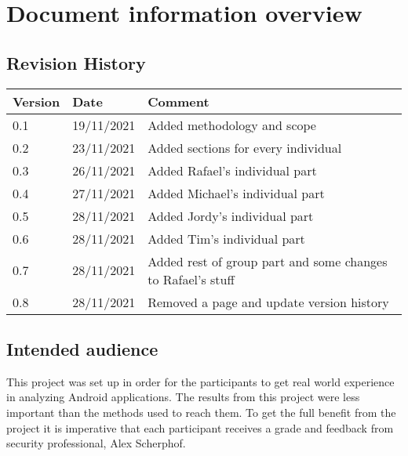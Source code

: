 \section*{Document information overview}
\subsection*{Revision History}

\begin{tabularx}{\textwidth}{|l|l|X|}
  \hline
  \textbf{Version} & \textbf{Date} & \textbf{Comment}                  \\ \hline
  0.1              & 19/11/2021    & Added methodology and scope       \\ \hline
  0.2              & 23/11/2021    & Added sections for every individual \\ \hline
  0.3              & 26/11/2021    & Added Rafael's individual part      \\ \hline
  0.4              & 27/11/2021    & Added Michael's individual part      \\ \hline
  0.5              & 28/11/2021    & Added Jordy's individual part      \\ \hline
  0.6              & 28/11/2021    & Added Tim's individual part      \\ \hline
  0.7              & 28/11/2021    & Added rest of group part and some changes to Rafael's stuff      \\ \hline
  0.8              & 28/11/2021    & Removed a page and update version history     \\ \hline
\end{tabularx}

\subsection*{Intended audience}

This project was set up in order for the participants to get real world experience in analyzing Android applications.
The results from this project were less important than the methods used to reach them.
To get the full benefit from the project it is imperative that each participant receives a grade and feedback from security professional, Alex Scherphof.

\newpage
